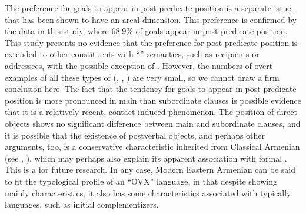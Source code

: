 \documentclass[output=paper,colorlinks,citecolor=brown,draftmode]{langscibook}
\begin{document}
The preference for goals to appear in post-predicate position is a separate issue, that has been shown to have an areal dimension. This preference is confirmed by the data in this study, where 68.9\% of goals appear in post-predicate position. This study presents no evidence that the preference for post-predicate position is extended to other constituents with ``'' semantics, such as recipients or addressees, with the possible exception of . However, the numbers of overt examples of all these types of  (, , ) are very small, so we cannot draw a firm conclusion here. The fact that the tendency for goals to appear in post-predicate position is more pronounced in main than subordinate clauses is possible evidence that it is a relatively recent, contact-induced phenomenon. The position of direct objects shows no significant difference between main and subordinate clauses, and it is possible that the existence of postverbal objects, and perhaps other arguments, too, is a conservative characteristic inherited from Classical Armenian (see \citealt{samvelian_persistence_2023}, \citealt{stilo_preverbal_2018}), which may perhaps also explain its apparent association with formal . This is a  for future research. In any case, Modern Eastern Armenian can be said to fit the typological profile of an ``OVX'' language, in that despite showing mainly  characteristics, it also has some characteristics associated with typically  languages, such as initial complementizers.
\end{document}

